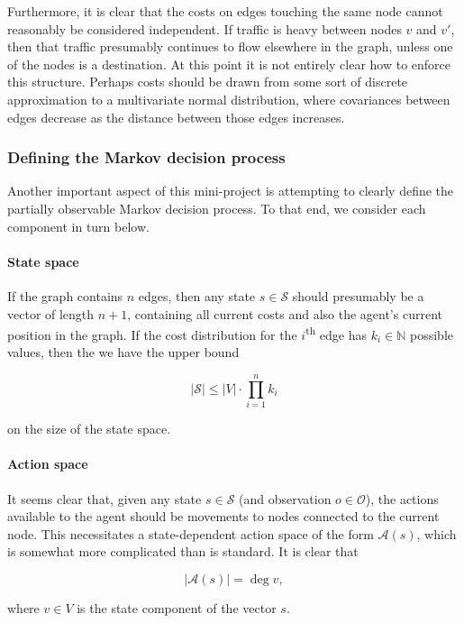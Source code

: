 Furthermore, it is clear that the costs on edges touching the same node cannot reasonably be considered independent. If traffic is heavy between nodes $v$ and $v'$, then that traffic presumably continues to flow elsewhere in the graph, unless one of the nodes is a destination. At this point it is not entirely clear how to enforce this structure. Perhaps costs should be drawn from some sort of discrete approximation to a multivariate normal distribution, where covariances between edges decrease as the distance between those edges increases.

\subsubsection{Defining the Markov decision process}

Another important aspect of this mini-project is attempting to clearly define the partially observable Markov decision process. To that end, we consider each component in turn below.

\paragraph{State space} If the graph contains $n$ edges, then any state $s \in \mathcal S$ should presumably be a vector of length $n + 1$, containing all current costs and also the agent's current position in the graph. If the cost distribution for the $i$\textsuperscript{th} edge has $k_i \in \mathbb N$ possible values, then the we have the upper bound

\[
    \lvert \mathcal S \rvert \leq \lvert V \rvert \cdot \prod_{i = 1}^n k_i
\]

on the size of the state space.

\paragraph{Action space} It seems clear that, given any state $s \in \mathcal S$ (and observation $o \in \mathcal O$), the actions available to the agent should be movements to nodes connected to the current node. This necessitates a state-dependent action space of the form $\mathcal A(s)$, which is somewhat more complicated than is standard. It is clear that

\[
    \lvert \mathcal A(s) \rvert = \deg v,
\]

where $v \in V$ is the state component of the vector $s$.


